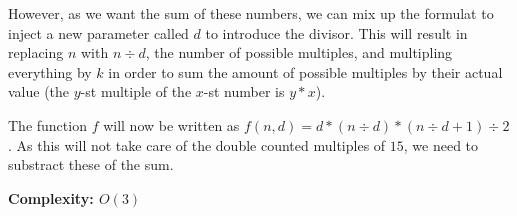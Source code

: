 \documentclass[12pt,notitlepage]{article}
\begin{document}
  However, as we want the sum of these numbers, we can mix
  up the formulat to inject a new parameter called $d$ to introduce the divisor. This will result
  in replacing $n$ with $n \div d$, the number of possible multiples, and multipling everything by $k$ in order to sum the amount of
  possible multiples by their actual value (the $y$-st multiple of the $x$-st number is $y * x$).\par

  The function $f$ will now be written as $f(n, d) = d * (n \div d) * (n \div d + 1) \div 2$. As this
  will not take care of the double counted multiples of $15$, we need to substract these of the sum.\par

  \textbf{Complexity: $O(3)$}
\end{document}
